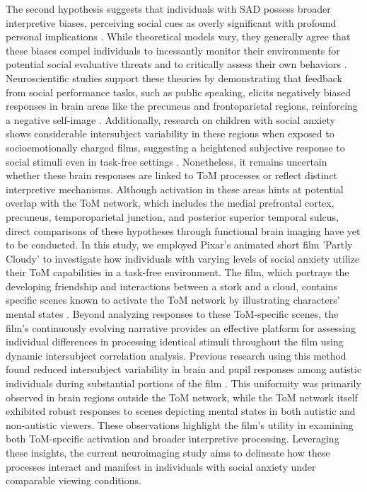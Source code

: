 The second hypothesis suggests that individuals with SAD possess broader interpretive biases, perceiving social cues as overly significant with profound personal implications \citep{clark1995,rapee1997}. While theoretical models vary, they generally agree that these biases compel individuals to incessantly monitor their environments for potential social evaluative threats \citep{amir1998,constans1999,heimberg2014,hirsch2004,stopa2000} and to critically assess their own behaviors \citep{rapee1992,stopa1993}. Neuroscientific studies support these theories by demonstrating that feedback from social performance tasks, such as public speaking, elicits negatively biased responses in brain areas like the precuneus and frontoparietal regions, reinforcing a negative self-image \citep{koban2023}. Additionally, research on children with social anxiety shows considerable intersubject variability in these regions when exposed to socioemotionally charged films, suggesting a heightened subjective response to social stimuli even in task-free settings \citep{camacho2023}. Nonetheless, it remains uncertain whether these brain responses are linked to ToM processes or reflect distinct interpretive mechanisms. Although activation in these areas hints at potential overlap with the ToM network, which includes the medial prefrontal cortex, precuneus, temporoparietal junction, and posterior superior temporal sulcus, direct comparisons of these hypotheses through functional brain imaging have yet to be conducted.
In this study, we employed Pixar's animated short film 'Partly Cloudy' to investigate how individuals with varying levels of social anxiety utilize their ToM capabilities in a task-free environment. The film, which portrays the developing friendship and interactions between a stork and a cloud, contains specific scenes known to activate the ToM network by illustrating characters' mental states \citep{jacoby2016,paunov2019,richardson2018}. Beyond analyzing responses to these ToM-specific scenes, the film's continuously evolving narrative provides an effective platform for assessing individual differences in processing identical stimuli throughout the film using dynamic intersubject correlation analysis. Previous research using this method found reduced intersubject variability in brain and pupil responses among autistic individuals during substantial portions of the film \citep{mangnus2024BPCCNI}. This uniformity was primarily observed in brain regions outside the ToM network, while the ToM network itself exhibited robust responses to scenes depicting mental states in both autistic and non-autistic viewers. These observations highlight the film's utility in examining both ToM-specific activation and broader interpretive processing. Leveraging these insights, the current neuroimaging study aims to delineate how these processes interact and manifest in individuals with social anxiety under comparable viewing conditions.
